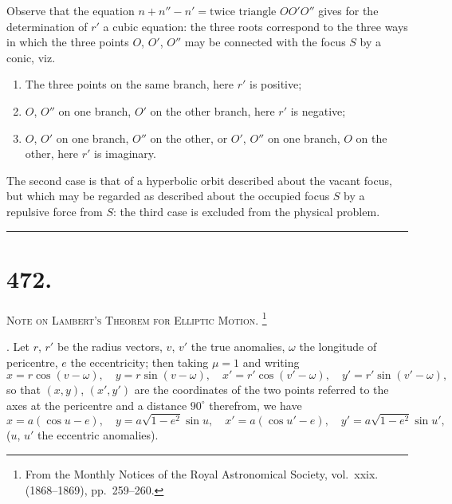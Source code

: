 \documentclass[11pt,a4paper]{article}
\theoremstyle{definition}
\begin{document}
\newpage
\noindent
Observe that the equation $n+n''-n'=\text{twice triangle }OO'O''$ gives for the
determination of $r'$ a cubic equation: the three roots correspond to the three ways in
which the three points $O$, $O'$, $O''$ may be connected with the focus $S$ by a conic, viz.
\begin{enumerate}
\item[(1)] The three points on the same branch, here $r'$ is positive;
\item[(2)] $O$, $O''$ on one branch, $O'$ on the other branch, here $r'$ is negative;
\item[(3)] $O$, $O'$ on one branch, $O''$ on the other, or $O'$, $O''$ on one branch, $O$ on the
other, here $r'$ is imaginary.
\end{enumerate}
The second case is that of a hyperbolic orbit described about the vacant focus, but
which may be regarded as described about the occupied focus $S$ by a repulsive force
from $S$: the third case is excluded from the physical problem.

\hfill\rule{1.5cm}{0.4pt}

\newpage

\section*{472.}
\markboth{NOTE ON LAMBERT'S THEOREM FOR ELLIPTIC MOTION.}{472]}

\noindent\textsc{Note on Lambert's Theorem for Elliptic Motion.}%
\footnote{From the Monthly Notices of the Royal Astronomical Society, vol.~xxix. (1868--1869), pp.~259--260.}

\smallskip

. Let $r$, $r'$ be the radius vectors, $v$, $v'$ the true anomalies, $\omega$ the longitude of
pericentre, $e$ the eccentricity; then taking $\mu=1$ and writing
\[
x = r\cos(v-\omega), \quad y = r\sin(v-\omega), \quad
x' = r'\cos(v'-\omega), \quad y' = r'\sin(v'-\omega),
\]
so that $(x,y)$, $(x',y')$ are the coordinates of the two points referred to the axes at the
pericentre and a distance $90^\circ$ therefrom, we have
\[
x = a(\cos u - e), \quad y = a\sqrt{1-e^2}\sin u, \quad
x' = a(\cos u' - e), \quad y' = a\sqrt{1-e^2}\sin u',
\]
($u$, $u'$ the eccentric anomalies).
\end{document}
